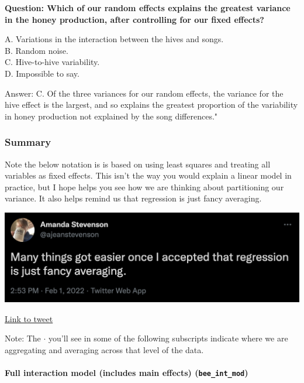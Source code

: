 \documentclass[
  openany]{book}
\begin{document}
\textbf{Question: Which of our random effects explains the greatest variance in the honey production, after controlling for our fixed effects?}

A. Variations in the interaction between the hives and songs.\\
B. Random noise.\\
C. Hive-to-hive variability.\\
D. Impossible to say.

Answer: C. Of the three variances for our random effects, the variance for the hive effect is the largest, and so explains the greatest proportion of the variability in honey production not explained by the song differences."

\hypertarget{summary-1}{%
\subsubsection{Summary}\label{summary-1}}

Note the below notation is is based on using least squares and treating all variables as fixed effects. This isn't the way you would explain a linear model in practice, but I hope helps you see how we are thinking about partitioning our variance. It also helps remind us that regression is just fancy averaging.

\includegraphics[width=16.44in]{images/m3/fancyaveraging}

\href{https://twitter.com/ajeanstevenson/status/1488601482505060352}{Link to tweet}

Note: The \(\cdot\) you'll see in some of the following subscripts indicate where we are aggregating and averaging across that level of the data.

\hypertarget{full-interaction-model-includes-main-effects-bee_int_mod}{%
\paragraph{\texorpdfstring{Full interaction model (includes main effects) (\texttt{bee\_int\_mod})}{Full interaction model (includes main effects) (bee\_int\_mod)}}\label{full-interaction-model-includes-main-effects-bee_int_mod}}
\end{document}
